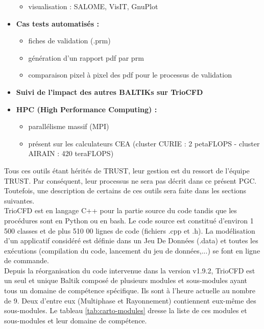 \begin{itemize}[label=$\Rightarrow$, font=\LARGE]
\begin{itemize}
    \item visualisation : SALOME, VisIT, GnuPlot
  \end{itemize}
  \item \textbf{Cas tests automatisés :}
  \begin{itemize}
    \item fiches de validation (.prm)
    \item g\'en\'eration d'un rapport pdf par prm
    \item comparaison pixel \`a pixel des pdf pour le processus de validation
  \end{itemize}
  \item \textbf{Suivi de l'impact des autres BALTIKs sur TrioCFD}
  \item \textbf{HPC (High Performance Computing) :}
  \begin{itemize}
    \item parallélisme massif (MPI)
    \item pr\'esent sur les calculateurs CEA (cluster CURIE : 2 petaFLOPS - cluster AIRAIN : 420 teraFLOPS)
  \end{itemize}
\end{itemize}\smallskip

Tous ces outils \'etant h\'erit\'es de TRUST, leur gestion est du ressort de l'\'equipe TRUST.
Par cons\'equent, leur processus ne sera pas d\'ecrit dans ce pr\'esent PGC. Toutefois, une description de certains de ces outils sera faite dans les sections suivantes.\\
TrioCFD est en langage C++ pour la partie source du code tandis que les proc\'edures sont en Python ou en bash.
Le code source est constitu\'e d'environ 1 500 classes et de plus 510 00 lignes de code (fichiers .cpp et .h).
La mod\'elisation d'un applicatif consid\'er\'e est d\'efinie dans un Jeu De Donn\'ees (.data)
et toutes les ex\'ecutions (compilation du code, lancement du jeu de donn\'ees,...) se font en ligne de commande. \smallskip\\

Depuis la r\'eorganisation du code intervenue dans la version v1.9.2, TrioCFD est un seul et unique Baltik
compos\'e de plusieurs modules et sous-modules ayant tous un domaine de comp\'etence sp\'ecifique.
Ils sont \`a l'heure actuelle au nombre de 9.
Deux d'entre eux (Multiphase et Rayonnement) contiennent eux-m\^eme des sous-modules.
Le tableau \ref{tab:carto-modules} dresse la liste de ces modules et sous-modules et leur domaine de comp\'etence.

